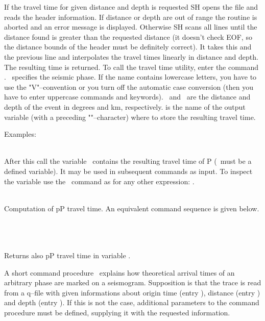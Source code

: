 If the travel time for given distance and depth is requested
SH opens the file and reads the header information.  If distance
or depth are out of range the routine is aborted and an error message
is displayed.  Otherwise SH scans all lines until the distance found
is greater than the requested distance (it doesn't check EOF,
so the distance bounds of the header must be definitely correct).
It takes this and the previous line and interpolates the travel
times linearly in distance and depth.  The resulting time is returned.
To call the travel time utility, enter the command
.  \
specifies the seismic phase.  If the name contains lowercase letters,
you have to use the "V"--convention or you turn off the automatic
case conversion (then you have to enter uppercase commands and
keywords).  \ and \ are the distance
and depth of the event in degrees and km, respectively.  
is the name of the output variable (with a preceding
"\exm{\&}"--character) where to store the resulting travel time.

\noindent
Examples:
\smallskip

\noindent
{}\\
After this call the variable \ contains the resulting
travel time of P (\exm{tt}\ must be a defined variable).  It may be
used in subsequent commands as input.  To inspect the variable
use the \ command as for any other expression:
.
\smallskip

\noindent
{}\\
Computation of pP travel time.  An equivalent command sequence
is given below.
\smallskip

\noindent
{}\\
\\
\\
Returns also pP travel time in variable .
\smallskip

A short command procedure \ explains how
theoretical arrival times of an arbitrary phase are marked
on a seismogram.  Supposition is that the trace is read from
a q--file with given informations about origin time (entry
), distance (entry ) and depth
(entry ).  If this is not the case, additional parameters
to the command procedure must be defined, supplying it with the
requested information.

